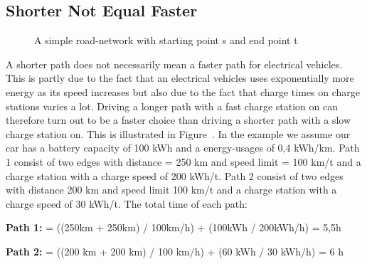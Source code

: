 \subsection{Shorter Not Equal Faster}

\begin{figure}

\label{figure:simpleroad-network}
\caption{A simple road-network with starting point s and end point t}
\end{figure}
A shorter path does not necessarily mean a faster path for electrical vehicles. 
This is partly due to the fact that an electrical vehicles uses exponentially more energy 
as its speed increases but also due to the fact that charge times on charge stations
varies a lot. Driving a longer path with a fast charge station on can therefore turn out to
be a faster choice than driving a shorter path with a slow charge station on. This is illustrated 
in Figure~. In the example we assume our car has a battery capacity of 100 kWh and a energy-usages of
0,4 kWh/km. Path 1 consist of two edges with distance = 250 km and speed limit = 100 km/t
and a charge station with a charge speed of 200 kWh/t. Path 2 consist of two edges with
distance 200 km and speed limit 100 km/t and a charge station with a charge speed of 30 kWh/t.
The total time of each path:
				
\textbf{Path 1:}  = ((250km + 250km) / 100km/h) + (100kWh / 200kWh/h) = 5,5h
				
\textbf{Path 2:}  = ((200 km + 200 km) / 100 km/h) + (60 kWh / 30 kWh/h) = 6 h